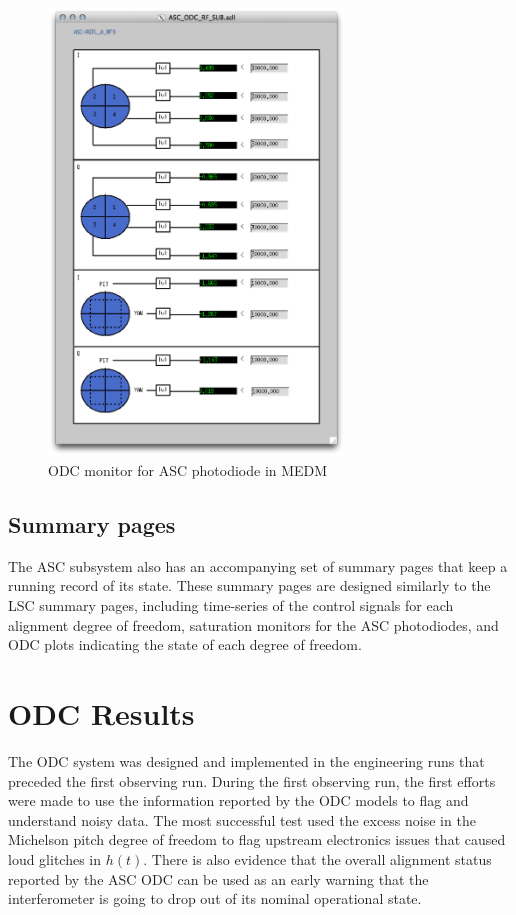 \begin{figure}[ht!]
\includegraphics[width=0.7\textwidth]{figures/ODC/PD_screen}
\caption[ASC ODC Photodiode Monitor in MEDM]{ODC monitor for ASC photodiode in MEDM}
\label{fig:odc-pd-screen}
\end{figure}

\subsection{Summary pages}

The ASC subsystem also has an accompanying set of summary pages that keep a running 
record of its state. These summary pages are designed similarly to the LSC summary 
pages, including time-series of the control signals for each alignment degree of freedom, 
saturation monitors for the ASC photodiodes,  
and ODC plots indicating the state of each degree of freedom.

\section{ODC Results}

The ODC system was designed and implemented in the engineering runs that preceded the 
first observing run. During the first observing run, the first efforts were made to 
use the information reported by the ODC models to flag and understand noisy data. 
The most successful test 
used the excess noise in the Michelson pitch degree of freedom to flag upstream 
electronics issues that caused loud glitches in $h(t)$. There is also evidence 
that the overall alignment status reported by the ASC ODC can be used as an early 
warning that the interferometer is going to drop out of its nominal operational 
state.

